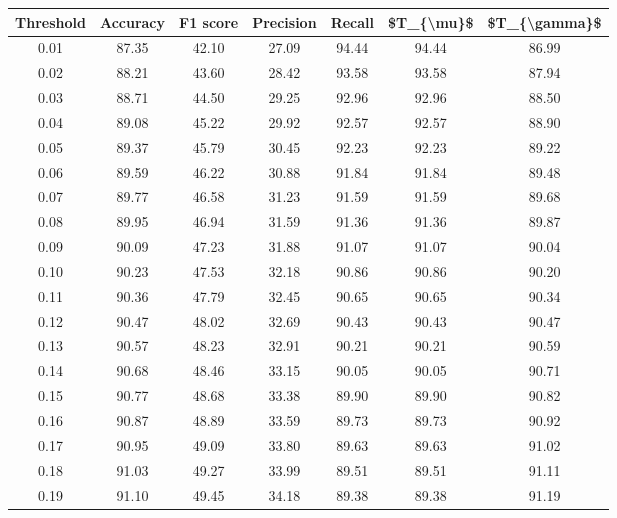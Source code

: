 \begin{tabular}{|c|c|c|c|c|c|c|}
\hline
 Threshold &  Accuracy &  F1 score &  Precision &  Recall &  \$T\_\{\textbackslash mu\}\$ &  \$T\_\{\textbackslash gamma\}\$ \\
\hline
      0.01 &     87.35 &     42.10 &      27.09 &   94.44 &      94.44 &         86.99 \\
      0.02 &     88.21 &     43.60 &      28.42 &   93.58 &      93.58 &         87.94 \\
      0.03 &     88.71 &     44.50 &      29.25 &   92.96 &      92.96 &         88.50 \\
      0.04 &     89.08 &     45.22 &      29.92 &   92.57 &      92.57 &         88.90 \\
      0.05 &     89.37 &     45.79 &      30.45 &   92.23 &      92.23 &         89.22 \\
      0.06 &     89.59 &     46.22 &      30.88 &   91.84 &      91.84 &         89.48 \\
      0.07 &     89.77 &     46.58 &      31.23 &   91.59 &      91.59 &         89.68 \\
      0.08 &     89.95 &     46.94 &      31.59 &   91.36 &      91.36 &         89.87 \\
      0.09 &     90.09 &     47.23 &      31.88 &   91.07 &      91.07 &         90.04 \\
      0.10 &     90.23 &     47.53 &      32.18 &   90.86 &      90.86 &         90.20 \\
      0.11 &     90.36 &     47.79 &      32.45 &   90.65 &      90.65 &         90.34 \\
      0.12 &     90.47 &     48.02 &      32.69 &   90.43 &      90.43 &         90.47 \\
      0.13 &     90.57 &     48.23 &      32.91 &   90.21 &      90.21 &         90.59 \\
      0.14 &     90.68 &     48.46 &      33.15 &   90.05 &      90.05 &         90.71 \\
      0.15 &     90.77 &     48.68 &      33.38 &   89.90 &      89.90 &         90.82 \\
      0.16 &     90.87 &     48.89 &      33.59 &   89.73 &      89.73 &         90.92 \\
      0.17 &     90.95 &     49.09 &      33.80 &   89.63 &      89.63 &         91.02 \\
      0.18 &     91.03 &     49.27 &      33.99 &   89.51 &      89.51 &         91.11 \\
      0.19 &     91.10 &     49.45 &      34.18 &   89.38 &      89.38 &         91.19 \\

\end{tabular}
